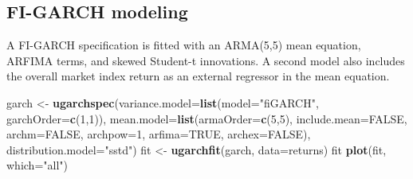 \documentclass[
  11pt,
]{article}
\newenvironment{Shaded}{\begin{snugshade}}{\end{snugshade}}
\newcommand{\AttributeTok}[1]{\textcolor[rgb]{0.13,0.29,0.53}{#1}}
\newcommand{\ConstantTok}[1]{\textcolor[rgb]{0.56,0.35,0.01}{#1}}
\newcommand{\DecValTok}[1]{\textcolor[rgb]{0.00,0.00,0.81}{#1}}
\newcommand{\FunctionTok}[1]{\textcolor[rgb]{0.13,0.29,0.53}{\textbf{#1}}}
\newcommand{\NormalTok}[1]{#1}
\newcommand{\OtherTok}[1]{\textcolor[rgb]{0.56,0.35,0.01}{#1}}
\newcommand{\StringTok}[1]{\textcolor[rgb]{0.31,0.60,0.02}{#1}}
\begin{document}
\subsection{FI-GARCH modeling}\label{fi-garch-modeling}

A FI-GARCH specification is fitted with an ARMA(5,5) mean equation,
ARFIMA terms, and skewed Student-t innovations. A second model also
includes the overall market index return as an external regressor in the
mean equation.

\begin{Shaded}
\begin{Highlighting}[]
\NormalTok{garch }\OtherTok{\textless{}{-}} \FunctionTok{ugarchspec}\NormalTok{(}\AttributeTok{variance.model=}\FunctionTok{list}\NormalTok{(}\AttributeTok{model=}\StringTok{"fiGARCH"}\NormalTok{, }\AttributeTok{garchOrder=}\FunctionTok{c}\NormalTok{(}\DecValTok{1}\NormalTok{,}\DecValTok{1}\NormalTok{)),}
                     \AttributeTok{mean.model=}\FunctionTok{list}\NormalTok{(}\AttributeTok{armaOrder=}\FunctionTok{c}\NormalTok{(}\DecValTok{5}\NormalTok{,}\DecValTok{5}\NormalTok{), }\AttributeTok{include.mean=}\ConstantTok{FALSE}\NormalTok{,}
                                     \AttributeTok{archm=}\ConstantTok{FALSE}\NormalTok{, }\AttributeTok{archpow=}\DecValTok{1}\NormalTok{, }\AttributeTok{arfima=}\ConstantTok{TRUE}\NormalTok{,}
                                     \AttributeTok{archex=}\ConstantTok{FALSE}\NormalTok{),}
                     \AttributeTok{distribution.model=}\StringTok{"sstd"}\NormalTok{)}
\NormalTok{fit }\OtherTok{\textless{}{-}} \FunctionTok{ugarchfit}\NormalTok{(garch, }\AttributeTok{data=}\NormalTok{returns)}
\NormalTok{fit}
\FunctionTok{plot}\NormalTok{(fit, }\AttributeTok{which=}\StringTok{"all"}\NormalTok{)}


\end{Highlighting}
\end{Shaded}
\end{document}
